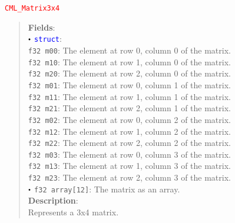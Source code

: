 \documentclass[a4paper,oneside,8pt]{extarticle}
\newcommand{\union}[1]{
  \noindent\textcolor{red}{\texttt{#1}}
  \vspace{-0.3em}
}
\renewcommand{\dot}{\raisebox{0.3ex}{\scalebox{0.6}{$\bullet$}}}
\theoremstyle{definition}
\begin{document}
\union{CML\_Matrix3x4}
\begin{quote}
  \textbf{Fields}: \\
  $\dot$ \textcolor{blue}{\texttt{struct}}: \\
  \indent\hspace{1em} \texttt{f32 m00}: The element at row 0, column 0 of the matrix. \\
  \indent\hspace{1em} \texttt{f32 m10}: The element at row 1, column 0 of the matrix. \\
  \indent\hspace{1em} \texttt{f32 m20}: The element at row 2, column 0 of the matrix. \\
  \indent\hspace{1em} \texttt{f32 m01}: The element at row 0, column 1 of the matrix. \\
  \indent\hspace{1em} \texttt{f32 m11}: The element at row 1, column 1 of the matrix. \\
  \indent\hspace{1em} \texttt{f32 m21}: The element at row 2, column 1 of the matrix. \\
  \indent\hspace{1em} \texttt{f32 m02}: The element at row 0, column 2 of the matrix. \\
  \indent\hspace{1em} \texttt{f32 m12}: The element at row 1, column 2 of the matrix. \\
  \indent\hspace{1em} \texttt{f32 m22}: The element at row 2, column 2 of the matrix. \\
  \indent\hspace{1em} \texttt{f32 m03}: The element at row 0, column 3 of the matrix. \\
  \indent\hspace{1em} \texttt{f32 m13}: The element at row 1, column 3 of the matrix. \\
  \indent\hspace{1em} \texttt{f32 m23}: The element at row 2, column 3 of the matrix. \\
  $\dot$ \texttt{f32 array[12]}: The matrix as an array. \\

  \vspace{-0.75em}
  \textbf{Description}: \\
  Represents a 3x4 matrix. \\
\end{quote}
\end{document}
